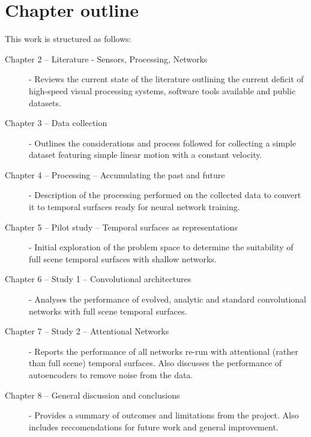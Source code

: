 \section{Chapter outline}
This work is structured as follows:
\begin{description}

\item [Chapter 2 -- Literature - Sensors, Processing, Networks] - Reviews the current state of the literature outlining the current deficit of high-speed visual processing systems, software tools available and public datasets. 

\item [Chapter 3 -- Data collection] - Outlines the considerations and process followed for collecting a simple dataset featuring simple linear motion with a constant velocity.

\item [Chapter 4 -- Processing -- Accumulating the past and future] - Description of the processing performed on the collected data to convert it to temporal surfaces ready for neural network training.

\item [Chapter 5 -- Pilot study -- Temporal surfaces as representations] - Initial exploration of the problem space to determine the suitability of full scene temporal surfaces with shallow networks.

\item [Chapter 6 -- Study 1 -- Convolutional architectures] - Analyses the performance of evolved, analytic and standard convolutional networks with full scene temporal surfaces. 

\item [Chapter 7 -- Study 2 -- Attentional Networks] - Reports the performance of all networks re-run with attentional (rather than full scene) temporal surfaces. Also discusses the performance of autoencoders to remove noise from the data.

\item [Chapter 8 -- General discussion and conclusions] - Provides a summary of outcomes and limitations from the project. Also includes reccomendations for future work and general improvement.


\end{description}






